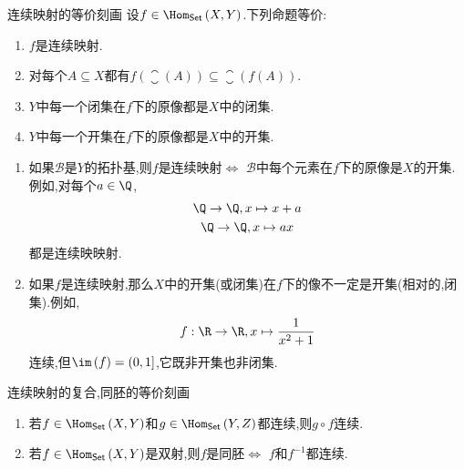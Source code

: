 \begin{theorem}{连续映射的等价刻画}{}
	设$f\in\Hom_{\mathsf{Set}}\left(X,Y\right)$.下列命题等价:
	\begin{enumerate}
		\item $f$是连续映射.
		\item 对每个$A\subseteq X$都有$f\left(\closure\left(A\right)\right)\subseteq\closure\left(f\left(A\right)\right)$.
		\item $Y$中每一个闭集在$f$下的原像都是$X$中的闭集.
		\item $Y$中每一个开集在$f$下的原像都是$X$中的开集.
	\end{enumerate}
\end{theorem}

\begin{remark}{}{}
	\begin{enumerate}
		\item 如果$\mathcal{B}$是$Y$的拓扑基,则$f$是连续映射$\iff$ $\mathcal{B}$中每个元素在$f$下的原像是$X$的开集.例如,对每个$a\in\Q$,
		\begin{gather*}
			\Q\to\Q,x\mapsto x+a\\
			\Q\to\Q,x\mapsto ax
		\end{gather*}
		都是连续映映射.
		\item 如果$f$是连续映射,那么$X$中的开集(或闭集)在$f$下的像不一定是开集(相对的,闭集).例如,
		\begin{align*}
			f:\R\to\R,x\mapsto\frac{1}{x^{2}+1}
		\end{align*}
		连续,但$\im\left(f\right)=\left(0,1\right]$,它既非开集也非闭集.
	\end{enumerate}
\end{remark}

\begin{theorem}{连续映射的复合,同胚的等价刻画}{}
	\begin{enumerate}
		\item 若$f\in\Hom_{\mathsf{Set}}\left(X,Y\right)$和$g\in\Hom_{\mathsf{Set}}\left(Y,Z\right)$都连续,则$g\circ f$连续.
		\item 若$f\in\Hom_{\mathsf{Set}}\left(X,Y\right)$是双射,则$f$是同胚$\iff$ $f$和$f^{-1}$都连续.
	\end{enumerate}
\end{theorem}

